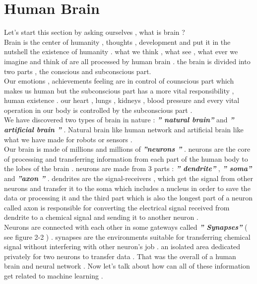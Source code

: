 \documentclass[12pt , a4paper]{article}
\begin{document}
\cleardoublepage

\section { Human Brain } \label{sec:1}
Let’s start this section by asking ourselves , what is brain ? \\
Brain is the center of humanity , thoughts , development and put it in the nutshell the existence of humanity . what we think , what see , what ever we imagine and think of are all processed by human brain . the brain is divided into two parts , the conscious and subconscious part. \\
Our emotions , achievements feeling are in control of counscious part which makes us human but the subconscious part has a more vital responsibility , human existence . our heart , lungs , kidneys , blood pressure and every vital operation in our body is controlled by the subconscious part .  \\
We have discovered two types of brain in nature : \textbf {\textit{'' natural brain''}}  and \textbf {\textit{'' artificial brain ''}} .
Natural brain like human network and artificial brain like what we have made for robots or sensors . \\
Our brain is made of millions and millions of \textbf {\textit{''neurons ''}} . neurons are the core of processing and transferring information from each part of the human body to the lobes of the brain . neurons are made from 3 parts : \textbf {\textit{'' dendrite''}}  , \textbf {\textit{'' soma''}} and \textbf {\textit{''axon ''}}  . dendrites are the signal-receivers , which get the signal from other neurons and transfer it to the soma which includes a nucleus in order to save the data or processing it and the third part which is also the longest part of a neuron called axon is responsible for converting the electrical signal received from dendrite to a chemical signal and sending it to another neuron .  \\
Neurons are connected with each other in some gateways called \textbf {\textit{'' Synapses''}} ( see figure 2-2 ) . synapses are the environments suitable for transferring chemical signal without interfering with other neuron’s job . an isolated area dedicated privately for two neurons to transfer data . 
That was the overall of a human brain and neural network . 
Now let’s talk about how can all of these information get related to machine learning . \\
\end{document}
